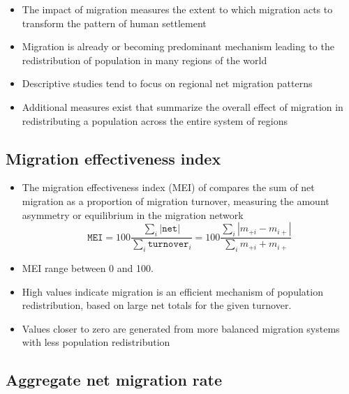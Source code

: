 \documentclass[
]{book}
\providecommand{\tightlist}{%
  \setlength{\itemsep}{0pt}\setlength{\parskip}{0pt}}
\begin{document}
\begin{itemize}
\tightlist
\item
  The impact of migration measures the extent to which migration acts to transform the pattern of human settlement
\item
  Migration is already or becoming predominant mechanism leading to the redistribution of population in many regions of the world
\item
  Descriptive studies tend to focus on regional net migration patterns
\item
  Additional measures exist that summarize the overall effect of migration in redistributing a population across the entire system of regions
\end{itemize}

\hypertarget{migration-effectiveness-index}{%
\subsection{Migration effectiveness index}\label{migration-effectiveness-index}}

\begin{itemize}
\tightlist
\item
  The migration effectiveness index (MEI) of \citet{Shryock1976} compares the sum of net migration as a proportion of migration turnover, measuring the amount asymmetry or equilibrium in the migration network
  \[
  \texttt{MEI} = 100 \frac{\sum_{i} | \texttt{net} |}{\sum_{i} \texttt{turnover}_i} = 100 \frac{\sum_{i} | m_{+i} - m_{i+}|}{\sum_{i} m_{+i} + m_{i+}}
  \]
\item
  MEI range between 0 and 100.
\item
  High values indicate migration is an efficient mechanism of population redistribution, based on large net totals for the given turnover.
\item
  Values closer to zero are generated from more balanced migration systems with less population redistribution
\end{itemize}

\hypertarget{aggregate-net-migration-rate}{%
\subsection{Aggregate net migration rate}\label{aggregate-net-migration-rate}}
\end{document}
